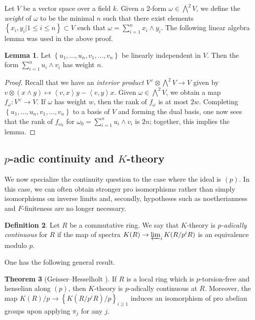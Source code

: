 \documentclass{amsart}
\theoremstyle{definition}
\newtheorem{definition}{Definition}[section]
\newtheorem{lemma}[definition]{Lemma}
\newtheorem{theorem}[definition]{Theorem}
\begin{document}
Let $V$ be a vector space over a field $k$. 
Given a 2-form $\omega \in \bigwedge^2 V$, we define the \emph{weight}
of $\omega$ to be the minimal $n$ such that there exist elements
$\left\{x_i, y_i|1 \leq i \leq n\right\} \subset V$ such that
$\omega = \sum_{i=1}^n x_i \wedge y_i$. 
The following linear algebra lemma was used in the above proof.
\begin{lemma} 
\label{linalg} 
Let $\left\{u_1, \dots, u_n, v_1, \dots, v_n\right\}$ be linearly independent in
$V$. Then the form $\sum_{i=1}^n u_i \wedge v_i$ has weight $n$. 
\end{lemma} 
\begin{proof} 
Recall that we have an \emph{interior product} $V^{\vee} \otimes \bigwedge^2 V
\to V$ given  by $v \otimes (x \wedge y) \mapsto \left \langle v,
x\right\rangle y - \left \langle v, y\right\rangle x$. 
Given $\omega \in \bigwedge^2 V$, we obtain a map $f_\omega: V^{\vee} \to V$. 
If $\omega$ has weight $w$, then the rank of $f_{\omega}$ is at most $2w$. 
Completing $\left\{u_1,\dots, u_n, v_1, \dots, v_n\right\}$ to a basis of $V$
and forming the dual basis, 
one now sees that the rank of $f_{\omega_0}$ for $\omega_0 = \sum_{i=1}^n u_i
\wedge v_i$ is $2n$; together, this implies the lemma. 
\end{proof} 


\subsection{$p$-adic continuity and $K$-theory}
We now specialize the continuity question to the case where the ideal is $(p)$.
In this case, we can often obtain stronger pro isomorphisms rather than simply isomorphisms on inverse limits and, secondly, hypotheses such as noetherianness and $F$-finiteness are no longer necessary. 

\begin{definition}
Let $R$ be a commutative ring. We say that $K$-theory is \emph{$p$-adically continuous} for $R$ if the map of spectra
$K(R) \to \varprojlim_i K(R/p^iR)$ is an equivalence modulo $p$.
\end{definition}

One has the following general result.

\begin{theorem}[Geisser--Hesselholt \cite{GHlocal}]
\label{GHcontinuity}
If $R$ is a local ring which is $p$-torsion-free and henselian along $(p)$, then $K$-theory is $p$-adically continuous at $R$. Moreover, the
map $K(R)/p \to \left\{ K(R/p^iR)/p\right\}_{i \geq 1}$ 
induces an isomorphism of pro abelian groups 
upon applying $\pi_j$ for any $j$. 
\end{theorem}
\end{document}
